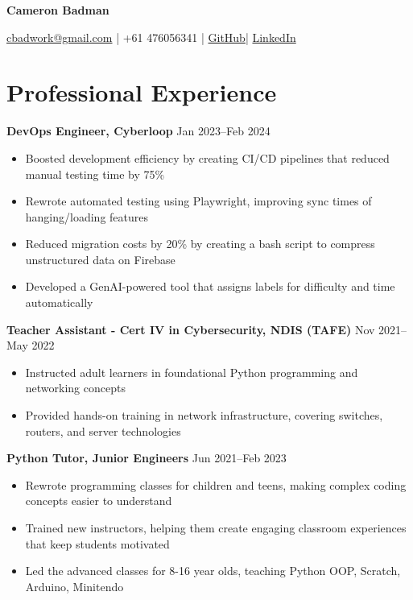 \documentclass[10pt,a4paper]{article}
\begin{document}
	\begin{center}
		{\huge\textbf{Cameron Badman}}
		\begin{center}
		\href{mailto:cbadwork@gmail.com}{cbadwork@gmail.com} |
		+61 476056341 |
		\href{https://github.com/CameronBadman}{GitHub}| 
		\href{https://www.linkedin.com/in/cameron-badman-5314ba1b8/}{LinkedIn}
		\end{center}
	\end{center}
	
	\section{Professional Experience}
	\textbf{DevOps Engineer, Cyberloop} \hfill Jan 2023--Feb 2024 
	\begin{itemize}[label=\textbullet, itemsep=0.05cm]
		\item Boosted development efficiency by creating CI/CD pipelines that reduced manual testing time by 75\%
		\item Rewrote automated testing using Playwright, improving sync times of hanging/loading features 
		\item Reduced migration costs by 20\% by creating a bash script to compress unstructured data on Firebase
		\item Developed a GenAI-powered tool that assigns labels for difficulty and time automatically
	\end{itemize}
	\vspace{0.1cm}
	
	\textbf{Teacher Assistant - Cert IV in Cybersecurity, NDIS (TAFE)} \hfill Nov 2021--May 2022 
	\begin{itemize}[label=\textbullet, itemsep=0.05cm]
		\item Instructed adult learners in foundational Python programming and networking concepts
		\item Provided hands-on training in network infrastructure, covering switches, routers, and server technologies
	\end{itemize}
	\vspace{0.1cm}
	
	\textbf{Python Tutor, Junior Engineers} \hfill Jun 2021--Feb 2023 
	\begin{itemize}[label=\textbullet, itemsep=0.05cm]
		\item Rewrote programming classes for children and teens, making complex coding concepts easier to understand
		\item Trained new instructors, helping them create engaging classroom experiences that keep students motivated
		\item Led the advanced classes for 8-16 year olds, teaching Python OOP, Scratch, Arduino, Minitendo
	\end{itemize}
	\vspace{0.1cm}
	
\end{document}
